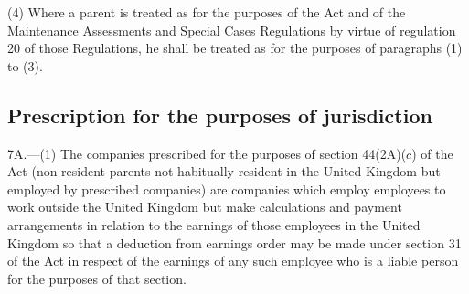 \documentclass[12pt,a4paper]{article}
\begin{document}
{%
(4) Where a parent is treated as  for the purposes of the Act and of the Maintenance Assessments and Special Cases Regulations by virtue of regulation 20 of those Regulations, he shall be treated as  for the purposes of paragraphs (1) to (3).

}

\subsection[7A. Prescription for the purposes of jurisdiction]{Prescription for the purposes of jurisdiction}

7A.---(1)  The companies prescribed for the purposes of section 44(2A)($c$)  of the Act (non-resident parents not habitually resident in the United Kingdom but employed by prescribed companies) are companies which employ employees to work outside the United Kingdom but make calculations and payment arrangements in relation to the earnings of those employees in the United Kingdom so that a deduction from earnings order may be made under section 31 of the Act in respect of the earnings of any such employee who is a liable person for the purposes of that section.
\end{document}
